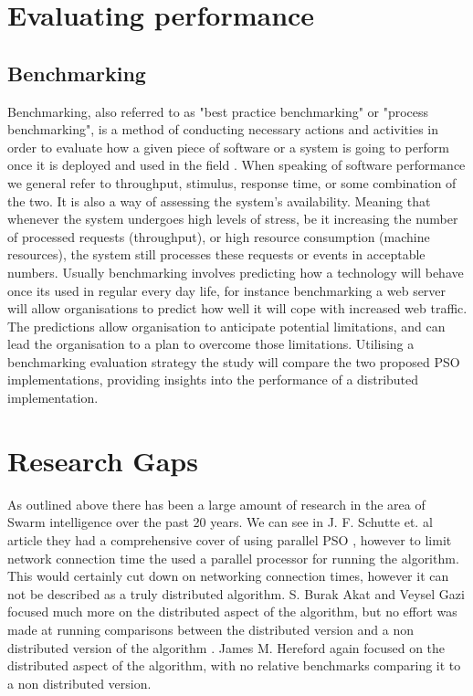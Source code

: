 \documentclass[oneside,12pt]{book}
\begin{document}
\section{Evaluating performance}
\subsection{Benchmarking}
Benchmarking, also referred to as "best practice benchmarking" or "process benchmarking", is  a  method  of  conducting  necessary  actions  and  activities  in  order  to evaluate  how  a  given  piece  of  software  or  a  system  is  going  to perform  once  it  is deployed and used in the field \cite{vokolos1998performance}. When speaking of software performance we general refer to throughput, stimulus, response time, or some combination of the two\cite{vokolos1998performance}.  It is also a way of assessing the system’s availability. Meaning that whenever the system undergoes high levels of stress, be it increasing the number of processed requests (throughput), or high resource consumption (machine resources), the system still processes these requests or events in acceptable numbers\cite{vokolos1998performance}.  Usually benchmarking involves predicting how a technology will behave once its used in regular every day life, for instance benchmarking a web server will allow organisations to predict how well it will cope with increased web traffic. The predictions allow organisation to anticipate potential limitations, and can lead the organisation to a plan to overcome those limitations. Utilising a benchmarking evaluation strategy the study will compare the two proposed PSO implementations, providing insights into the performance of a distributed implementation. 
 
\section{Research Gaps}
As outlined above there has been a large amount of research in the area of Swarm intelligence over the past 20 years. We can see in J. F. Schutte et. al article they had a comprehensive cover of using parallel PSO \cite{schutte2004parallel}, however to limit network connection time the used a parallel processor for running the algorithm. This would certainly cut down on networking connection times, however it can not be described as a truly distributed algorithm. S. Burak Akat and Veysel Gazi focused much more on the distributed aspect of the algorithm, but no effort was made at running comparisons between the distributed version and a non distributed version of the algorithm \cite{akat_gazi_2008}. James M. Hereford again focused on the distributed aspect of the algorithm, with no relative benchmarks comparing it to a non distributed version. \cite{hereford_2006}
\end{document}
